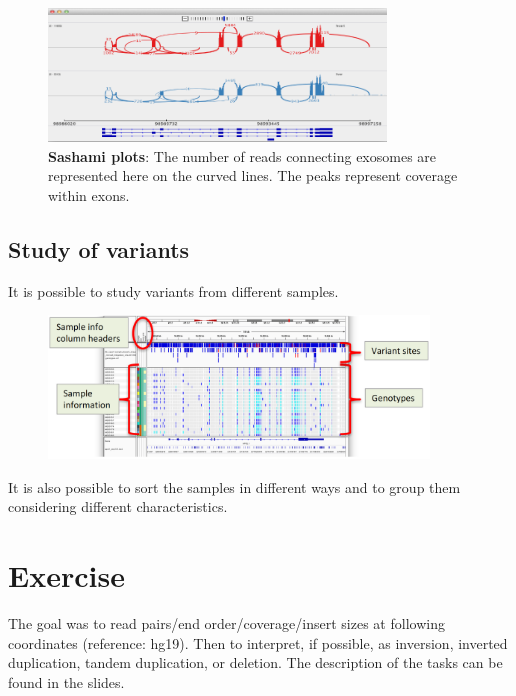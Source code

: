 \begin{figure}[H]
    \centering
    \includegraphics[width=0.8\textwidth]{sashamiplot.PNG}
    \caption{\textbf{Sashami plots}: The number of reads connecting exosomes are represented here on the curved lines. The peaks represent coverage within exons.}
    \label{fig:sashami}
\end{figure}

\subsection{Study of variants}
It is possible to study variants from different samples.
\begin{figure}[H]
    \centering
    \includegraphics[width=0.9\textwidth]{variantsView.PNG}
    \label{fig:variants}
\end{figure}

It is also possible to sort the samples in different ways and to group them
considering different characteristics.


\section{Exercise}
The goal was to read pairs/end order/coverage/insert sizes at following
coordinates (reference: hg19). Then to interpret, if possible, as inversion, inverted duplication, tandem duplication, or deletion. The description of the tasks can be found in the slides.

